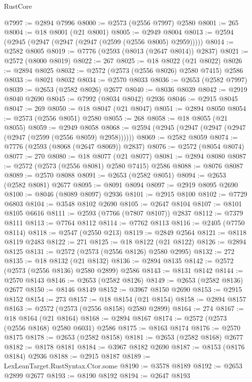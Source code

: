 \begin{lexlean}{RustCore}
\begin{coremodule}
@7997 := @2894 @7996
@8000 := @2573 (@2556 @7997) @2580
@8001 := 265
@8004 := @18 @8001 (@21 @8001)
@8005 := @2949 @8004
@8013 := @2594 (@2945 (@2947 (@2947 (@2947 (@2599 (@2556 @8005) @2959)))))
@8014 := @2582 @8005
@8019 := @7776 (@2593 (@8013 (@2647 @8014)) @2837)
@8021 := @2572 (@8000 @8019)
@8022 := 267
@8025 := @18 @8022 (@21 @8022)
@8026 := @2894 @8025
@8032 := @2572 (@2573 (@2556 @8026) @2580 @7415) @2586
@8033 := @8021 @8032
@8034 := @2570 @8033
@8036 := @2653 (@2582 @7997)
@8039 := @2653 (@2582 @8026) @2677
@8040 := @8036 @8039
@8042 := @2919 @8040 @2690
@8045 := @7992 (@8034 @8042) @2936
@8046 := @2915 @8045
@8047 := 269
@8050 := @18 @8047 (@21 @8047)
@8051 := @2894 @8050
@8054 := @2573 (@2556 @8051) @2580
@8055 := 268
@8058 := @18 @8055 (@21 @8055)
@8059 := @2949 @8058
@8068 := @2594 (@2945 (@2947 (@2947 (@2947 (@2947 (@2599 (@2556 @8059) @2958))))))
@8069 := @2582 @8059
@8074 := @7776 (@2593 (@8068 (@2647 @8069)) @2837)
@8076 := @2572 (@8054 @8074)
@8077 := 270
@8080 := @18 @8077 (@21 @8077)
@8081 := @2894 @8080
@8087 := @2572 (@2573 (@2556 @8081) @2580 @7415) @2586
@8088 := @8076 @8087
@8089 := @2570 @8088
@8091 := @2653 (@2582 @8051)
@8094 := @2653 (@2582 @8081) @2677
@8095 := @8091 @8094
@8097 := @2919 @8095 @2690
@8100 := @8046 (@8089 @8097) @2936
@8101 := @2915 @8100
@8102 := @7729 @6803
@8104 := @3548 @8102 @2690
@8105 := @2647 @8104
@8107 := @8101 @8105 @6616
@8111 := @2593 (@7766 (@7807 @8107)) @2837
@8112 := @7379 @8111
@8113 := @7764 @8112
@8114 := @7762 @8113
@8116 := @2405 (@7750 @8114)
@8118 := @2547 (@2550 @213)
@8119 := @2849 @2564
@8121 := @8118 @8119 @2483
@8122 := 271
@8125 := @18 @8122 (@21 @8122)
@8126 := @2894 @8125
@8131 := @2572 (@2573 (@2556 @8126) @2580 @2995)
@8132 := 272
@8135 := @18 @8132 (@21 @8132)
@8136 := @2894 @8135
@8142 := @2572 (@2573 (@2556 @8136) @2580 @2899) @2586
@8143 := @8131 @8142
@8144 := @2570 @8143
@8146 := @2653 (@2582 @8126)
@8149 := @2653 (@2582 @8136) @2677
@8150 := @8146 @8149
@8152 := @3967 @8150 @2690
@8153 := @2915 @8152
@8154 := 273
@8157 := @18 @8154 (@21 @8154)
@8158 := @2894 @8157
@8163 := @2572 (@2573 (@2556 @8158) @2580 @2899)
@8164 := 274
@8167 := @18 @8164 (@21 @8164)
@8168 := @2894 @8167
@8174 := @2572 (@2573 (@2556 @8168) @2580 @6031) @2586
@8175 := @8163 @8174
@8176 := @2570 @8175
@8178 := @2653 (@2582 @8158)
@8181 := @2653 (@2582 @8168) @2677
@8182 := @8178 @8181
@8184 := @3967 @8182 @2690
@8187 := @8153 (@8176 @8184) @2936
@8188 := @2915 @8187
@8189 := LexLeanTarget.RustSyntax.Ctor.some
@8190 := @3578 @8189
@8192 := @2653 @2899 @2677
@8193 := @8190 @8192
@8194 := @2647 @8193

\end{coremodule}
\end{lexlean}
